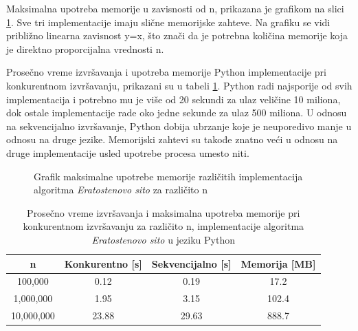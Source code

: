 \documentclass[12pt,oneside]{memoir}
\begin{document}
Maksimalna upotreba memorije u zavisnosti od n, prikazana je grafikom na slici \ref{fig:prime2}. Sve tri implementacije imaju slične memorijske zahteve. Na grafiku se vidi približno linearna zavisnost y=x, što znači da je potrebna količina memorije koja je direktno proporcijalna vrednosti n.

Prosečno vreme izvršavanja i upotreba memorije Python implementacije pri konkurentnom izvršavanju, prikazani su u tabeli \ref{tab:prime1}. Python radi najsporije od svih implementacija i potrebno mu je više od 20 sekundi za ulaz veličine 10 miliona, dok ostale implementacije rade oko jedne sekunde za ulaz 500 miliona. U odnosu na sekvencijalno izvršavanje, Python dobija ubrzanje koje je neuporedivo manje u odnosu na druge jezike. Memorijski zahtevi su takođe znatno veći u odnosu na druge implementacije usled upotrebe procesa umesto niti.

\begin{figure}[H]
\begin{center}


\caption{Grafik maksimalne upotrebe memorije različitih implementacija algoritma \textit{Eratostenovo sito} za različito n}
\label{fig:prime2}
\end{center}
\end{figure}

\begin{table}[H]
\begin{center}
\caption{Prosečno vreme izvršavanja i maksimalna upotreba memorije pri konkurentnom izvršavanju za različito n, implementacije algoritma \textit{Eratostenovo sito} u jeziku Python}
\begin{tabular}{||c||c|c|c||}
\hline
n & Konkurentno [s]& Sekvencijalno [s] & Memorija [MB] \\ \hline
100,000	&0.12	&0.19&17.2\\
1,000,000	&1.95	&3.15&102.4\\
10,000,000	&23.88&29.63&888.7\\
\hline
\end{tabular}
\label{tab:prime1}
\end{center}
\end{table}
\end{document}

